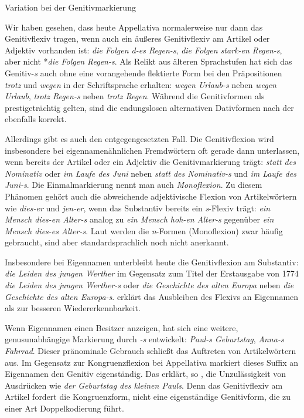 \begin{Exkurs}{Variation bei der Genitivmarkierung}\label{Exkurs:Gentivflexiv}
    
Wir haben gesehen, dass heute Appellativa normalerweise nur dann das Genitivflexiv tragen, wenn auch ein äußeres Genitivflexiv am Artikel oder Adjektiv vorhanden ist: \textit{die Folgen d-es Regen-s}, \textit{die Folgen stark-en Regen-s}, aber nicht *\textit{die Folgen Regen-s}. Als Relikt aus älteren Sprachstufen hat sich das Genitiv-\textit{s} auch ohne eine vorangehende flektierte Form bei den Präpositionen \textit{trotz} und \textit{wegen} in der Schriftsprache erhalten: \textit{wegen Urlaub-s} neben \textit{wegen Urlaub}, \textit{trotz Regen-s} neben \textit{trotz Regen}. Während die Genitivformen als prestigeträchtig gelten, sind die endungslosen alternativen Dativformen nach der \citet[430, §699]{Duden2022} ebenfalls korrekt.

Allerdings gibt es auch den entgegengesetzten Fall. Die Genitivflexion wird insbesondere bei eigennamenähnlichen Fremdwörtern oft gerade dann unterlassen, wenn bereits der Artikel oder ein Adjektiv die Genitivmarkierung trägt: \textit{statt des Nominativ} oder \textit{im Laufe des Juni} neben \textit{statt des Nominativ-s} und \textit{im Laufe des Juni-s}. Die Einmalmarkierung nennt man auch \textit{Monoflexion}. Zu diesem Phänomen gehört auch die abweichende adjektivische Flexion von Artikelwörtern wie \textit{dies-er} und \textit{jen-er}, wenn das Substantiv bereits ein \textit{s}-Flexiv trägt: \textit{ein Mensch dies-en Alter-s} analog zu \textit{ein Mensch hoh-en Alter-s} gegenüber \textit{ein Mensch dies-es Alter-s}. Laut \citet[734, §1275]{Duden2022} werden die \textit{n}-Formen (Monoflexion) zwar häufig gebraucht, sind aber standardsprachlich noch nicht anerkannt. 

Insbesondere bei Eigennamen unterbleibt heute die Genitivflexion am Substantiv: \textit{die Leiden des jungen Werther} im Gegensatz zum Titel der Erstausgabe von 1774 \textit{die Leiden des jungen Werther-s} oder \textit{die Geschichte des alten Europa} neben \textit{die Geschichte des alten Europa-s}. \citet[237]{Nuebling2012} erklärt das Ausbleiben des Flexivs an Eigennamen als  zur besseren Wiedererkennbarkeit. 

Wenn Eigennamen einen Besitzer anzeigen, hat sich eine weitere, genusunabhängige Markierung durch \textit{-s} entwickelt: \textit{Paul-s Geburtstag}, \textit{Anna-s Fahrrad}. Dieser pränominale Gebrauch schließt das Auftreten von Artikelwörtern aus. Im Gegensatz zur Kongruenzflexion bei Appellativa markiert dieses Suffix an Eigennamen den Genitiv eigenständig. Das erklärt, so \citet[178--179]{Teuber2000}, die Unzulässigkeit von Ausdrücken wie \textit{der Geburtstag des kleinen Pauls}. Denn das Genitivflexiv am Artikel fordert die Kongruenzform, nicht eine eigenständige Genitivform, die zu einer Art Doppelkodierung führt. 

\end{Exkurs}

